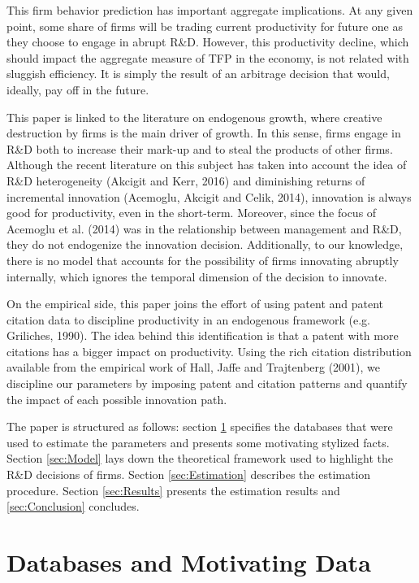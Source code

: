 \documentclass[letterpaper,12pt]{article}
\theoremstyle{definition}
\begin{document}
This firm behavior prediction has important aggregate implications. At any given point, some share of firms will be trading current productivity for future one as they choose to engage in abrupt R\&D. However, this productivity decline, which should impact the aggregate measure of TFP in the economy, is not related with sluggish efficiency. It is simply the result of an arbitrage decision that would, ideally, pay off in the future.

This paper is linked to the literature on endogenous growth, where creative destruction by firms is the main driver of growth. In this sense, firms engage in R\&D both to increase their mark-up and to steal the products of other firms. Although the recent literature on this subject has taken into account the idea of R\&D heterogeneity (Akcigit and Kerr, 2016) and diminishing returns of incremental innovation (Acemoglu, Akcigit and Celik, 2014), innovation is always good for productivity, even in the short-term. Moreover, since the focus of Acemoglu et al. (2014) was in the relationship between management and R\&D, they do not endogenize the innovation decision. Additionally, to our knowledge, there is no model that accounts for the possibility of firms innovating abruptly internally, which ignores the temporal dimension of the decision to innovate.

On the empirical side, this paper joins the effort of using patent and patent citation data to discipline productivity in an endogenous framework (e.g. Griliches, 1990). The idea behind this identification is that a patent with more citations has a bigger impact on productivity. Using the rich citation distribution available from the empirical work of Hall, Jaffe and Trajtenberg (2001), we discipline our parameters by imposing patent and citation patterns and quantify the impact of each possible innovation path. 

The paper is structured as follows: section \ref{sec:Data} specifies the databases that were used to estimate the parameters and presents some motivating stylized facts. Section \ref{sec:Model} lays down the theoretical framework used to highlight the R\&D decisions of firms. Section \ref{sec:Estimation} describes the estimation procedure. Section \ref{sec:Results} presents the estimation results and \ref{sec:Conclusion} concludes.

\section{Databases and Motivating Data}\label{sec:Data}
\end{document}
